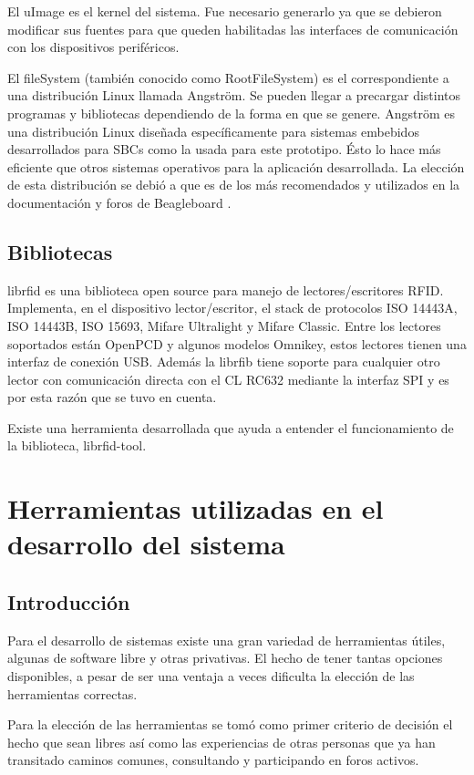El uImage es el kernel del sistema. Fue necesario generarlo ya que se debieron modificar sus fuentes para que queden habilitadas las interfaces de comunicación con los dispositivos periféricos.

El fileSystem (también conocido como RootFileSystem) es el correspondiente a una distribución Linux llamada Angström. Se pueden llegar a precargar distintos programas y bibliotecas dependiendo de la forma en que se genere.
Angström es una distribución Linux diseñada específicamente para sistemas embebidos desarrollados
para SBCs como la usada para este prototipo. Ésto lo hace más eficiente que otros sistemas operativos para la aplicación desarrollada. La elección de esta distribución se debió a que es de los más recomendados y utilizados en la documentación y foros de Beagleboard \cite{foroBb}.

\subsection{Bibliotecas}
librfid es una biblioteca open source para manejo de lectores/escritores RFID. Implementa, en el dispositivo lector/escritor, el stack de protocolos ISO 14443A, ISO 14443B, ISO 15693, Mifare Ultralight y Mifare Classic.
Entre los lectores soportados están OpenPCD y algunos modelos Omnikey, estos lectores tienen  una interfaz de conexión USB. Además la librfib tiene soporte para cualquier otro lector con comunicación directa con el CL RC632 mediante la interfaz SPI y es por esta razón que se tuvo en cuenta.

\bigskip
Existe una herramienta desarrollada que ayuda a entender el funcionamiento de la biblioteca, librfid-tool.

\section{Herramientas utilizadas en el desarrollo del sistema}

\subsection{Introducción}
Para el desarrollo de sistemas existe una gran variedad de herramientas útiles, algunas de software libre y otras privativas. El hecho de tener tantas opciones disponibles, a pesar de ser una ventaja a veces dificulta la elección de las herramientas correctas.

Para la elección de las herramientas se tomó como primer criterio de decisión el hecho que sean libres así como las experiencias de otras personas que ya han transitado caminos comunes, consultando y participando en foros activos.

